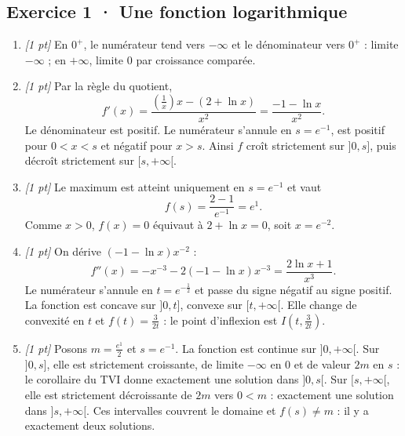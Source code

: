 \subsection*{Exercice 1 · Une fonction logarithmique}\begin{enumerate}

\item \textit{[1 pt]} En $0^+$, le numérateur tend vers $-\infty$ et le dénominateur vers $0^+$ : limite $-\infty$ ; en $+\infty$, limite $0$ par croissance comparée.

\item \textit{[1 pt]} Par la règle du quotient,
\[f'(x)=\frac{(\frac{1}{x})x-(2+\ln x)}{x^2}=\frac{-1-\ln x}{x^2}.\]
Le dénominateur est positif. Le numérateur s'annule en $s=e^{-1}$, est positif pour $0<x<s$ et négatif pour $x>s$. Ainsi $f$ croît strictement sur $]0,s]$, puis décroît strictement sur $[s,+\infty[$.

\item \textit{[1 pt]} Le maximum est atteint uniquement en $s=e^{-1}$ et vaut
\[f(s)=\frac{2- 1}{e^{-1}}=e^{1}.\]
Comme $x>0$, $f(x)=0$ équivaut à $2+\ln x=0$, soit $x=e^{-2}$.

\item \textit{[1 pt]} On dérive $(-1-\ln x)x^{-2}$ :
\[f''(x)=-x^{-3}-2(-1-\ln x)x^{-3}=\frac{2\ln x+1}{x^3}.\]
Le numérateur s'annule en $t=e^{-\frac{1}{2}}$ et passe du signe négatif au signe positif. La fonction est concave sur $]0,t]$, convexe sur $[t,+\infty[$. Elle change de convexité en $t$ et $f(t)=\frac{3}{2t}$ : le point d'inflexion est $I(t,\frac{3}{2t})$.

\item \textit{[1 pt]} Posons $m=\frac{e^{1}}{2}$ et $s=e^{-1}$. La fonction est continue sur $]0,+\infty[$. Sur $]0,s]$, elle est strictement croissante, de limite $-\infty$ en $0$ et de valeur $2m$ en $s$ : le corollaire du TVI donne exactement une solution dans $]0,s[$. Sur $[s,+\infty[$, elle est strictement décroissante de $2m$ vers $0<m$ : exactement une solution dans $]s,+\infty[$. Ces intervalles couvrent le domaine et $f(s)\ne m$ : il y a exactement deux solutions.

\end{enumerate}

